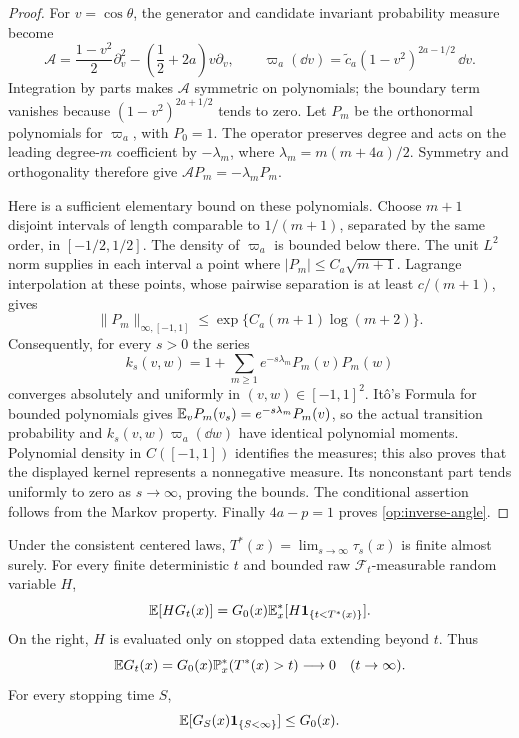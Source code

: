 \begin{proof}
For $v=\cos\theta$, the generator and candidate invariant probability
measure become
\[
 \mathcal A=\frac{1-v^2}{2}\partial_v^2
              -\left(\frac12+2a\right)v\partial_v,
 \qquad \varpi_a(\dd v)=\widetilde c_a
              (1-v^2)^{2a-1/2}\,\dd v.
\]
Integration by parts makes $\mathcal A$ symmetric on polynomials; the
boundary term vanishes because $(1-v^2)^{2a+1/2}$ tends to zero.
Let $P_m$ be the orthonormal polynomials for $\varpi_a$, with $P_0=1$.
The operator preserves degree and acts on the leading degree-$m$
coefficient by $-\lambda_m$, where
$\lambda_m=m(m+4a)/2$. Symmetry and orthogonality therefore give
$\mathcal AP_m=-\lambda_mP_m$.

Here is a sufficient elementary bound on these polynomials. Choose
$m+1$ disjoint intervals of length comparable to $1/(m+1)$, separated
by the same order, in $[-1/2,1/2]$. The density of $\varpi_a$ is bounded
below there. The unit $L^2$ norm supplies in each interval a point
where $|P_m|\le C_a\sqrt{m+1}$. Lagrange interpolation at these points,
whose pairwise separation is at least $c/(m+1)$, gives
\[
 \|P_m\|_{\infty,[-1,1]}
 \le \exp\{C_a(m+1)\log(m+2)\}.
\]
Consequently, for every $s>0$ the series
\[
 k_s(v,w)=1+\sum_{m\ge1}e^{-s\lambda_m}P_m(v)P_m(w)
\]
converges absolutely and uniformly in $(v,w)\in[-1,1]^2$.
It\^o's Formula for bounded polynomials gives
$\mathbb E_vP_m(v_s)=e^{-s\lambda_m}P_m(v)$, so the actual transition
probability and $k_s(v,w)\varpi_a(\dd w)$ have identical polynomial
moments. Polynomial density in $C([-1,1])$ identifies the measures;
this also proves that the displayed kernel represents a nonnegative
measure. Its nonconstant part tends uniformly to zero as
$s\to\infty$, proving the bounds. The conditional assertion follows
from the Markov property. Finally $4a-p=1$ proves
\eqref{op:inverse-angle}.
\end{proof}

\begin{proposition}
\label{op:potential}
Under the consistent centered laws,
$T^*(x)=\lim_{s\to\infty}\tau_s(x)$ is finite almost surely.
For every finite deterministic $t$ and bounded raw
$\mathcal F_t$-measurable random variable $H$,
\begin{equation}
 \mathbb E[H G_t(x)]
 =G_0(x)\mathbb E_x^*[H\mathbf 1_{\{t<T^*(x)\}}].
 \label{op:tested-potential}
\end{equation}
On the right, $H$ is evaluated only on stopped data extending beyond
$t$. Thus
\begin{equation}
 \mathbb E G_t(x)=G_0(x)\mathbb P_x^*(T^*(x)>t)\longrightarrow0
 \quad(t\to\infty).
 \label{op:potential-decay}
\end{equation}
For every stopping time $S$,
\begin{equation}
 \mathbb E[G_S(x)\mathbf 1_{\{S<\infty\}}]\le G_0(x).
 \label{op:optional-bound}
\end{equation}
\end{proposition}

